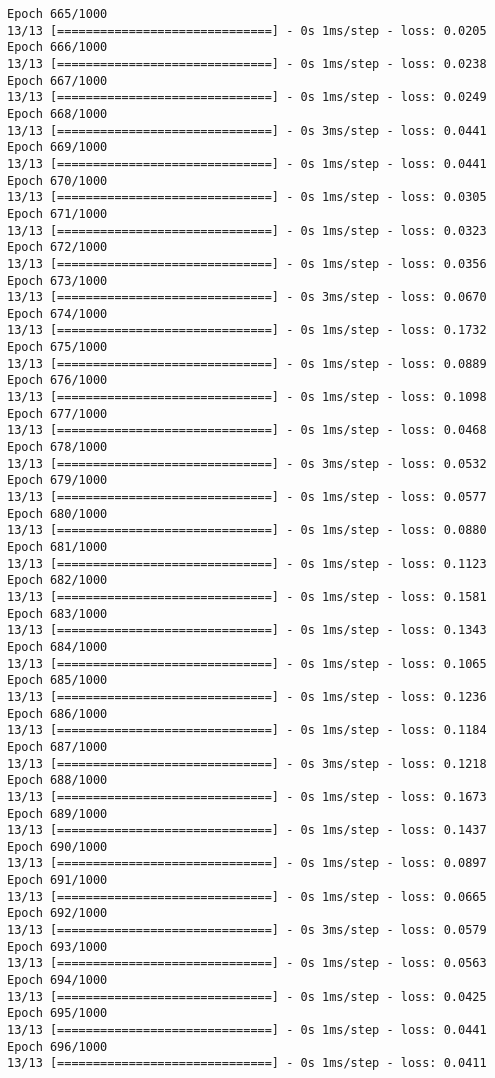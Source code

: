 \documentclass[11pt]{article}
\begin{document}
\begin{Verbatim}[commandchars=\\\{\}]
Epoch 665/1000
13/13 [==============================] - 0s 1ms/step - loss: 0.0205
Epoch 666/1000
13/13 [==============================] - 0s 1ms/step - loss: 0.0238
Epoch 667/1000
13/13 [==============================] - 0s 1ms/step - loss: 0.0249
Epoch 668/1000
13/13 [==============================] - 0s 3ms/step - loss: 0.0441
Epoch 669/1000
13/13 [==============================] - 0s 1ms/step - loss: 0.0441
Epoch 670/1000
13/13 [==============================] - 0s 1ms/step - loss: 0.0305
Epoch 671/1000
13/13 [==============================] - 0s 1ms/step - loss: 0.0323
Epoch 672/1000
13/13 [==============================] - 0s 1ms/step - loss: 0.0356
Epoch 673/1000
13/13 [==============================] - 0s 3ms/step - loss: 0.0670
Epoch 674/1000
13/13 [==============================] - 0s 1ms/step - loss: 0.1732
Epoch 675/1000
13/13 [==============================] - 0s 1ms/step - loss: 0.0889
Epoch 676/1000
13/13 [==============================] - 0s 1ms/step - loss: 0.1098
Epoch 677/1000
13/13 [==============================] - 0s 1ms/step - loss: 0.0468
Epoch 678/1000
13/13 [==============================] - 0s 3ms/step - loss: 0.0532
Epoch 679/1000
13/13 [==============================] - 0s 1ms/step - loss: 0.0577
Epoch 680/1000
13/13 [==============================] - 0s 1ms/step - loss: 0.0880
Epoch 681/1000
13/13 [==============================] - 0s 1ms/step - loss: 0.1123
Epoch 682/1000
13/13 [==============================] - 0s 1ms/step - loss: 0.1581
Epoch 683/1000
13/13 [==============================] - 0s 1ms/step - loss: 0.1343
Epoch 684/1000
13/13 [==============================] - 0s 1ms/step - loss: 0.1065
Epoch 685/1000
13/13 [==============================] - 0s 1ms/step - loss: 0.1236
Epoch 686/1000
13/13 [==============================] - 0s 1ms/step - loss: 0.1184
Epoch 687/1000
13/13 [==============================] - 0s 3ms/step - loss: 0.1218
Epoch 688/1000
13/13 [==============================] - 0s 1ms/step - loss: 0.1673
Epoch 689/1000
13/13 [==============================] - 0s 1ms/step - loss: 0.1437
Epoch 690/1000
13/13 [==============================] - 0s 1ms/step - loss: 0.0897
Epoch 691/1000
13/13 [==============================] - 0s 1ms/step - loss: 0.0665
Epoch 692/1000
13/13 [==============================] - 0s 3ms/step - loss: 0.0579
Epoch 693/1000
13/13 [==============================] - 0s 1ms/step - loss: 0.0563
Epoch 694/1000
13/13 [==============================] - 0s 1ms/step - loss: 0.0425
Epoch 695/1000
13/13 [==============================] - 0s 1ms/step - loss: 0.0441
Epoch 696/1000
13/13 [==============================] - 0s 1ms/step - loss: 0.0411

\end{Verbatim}
\end{document}
